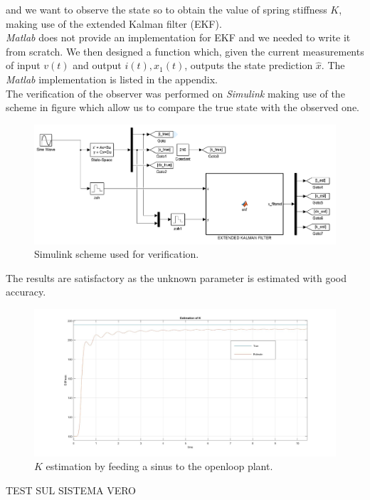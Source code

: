 and we want to observe the state so to obtain the value of spring stiffness $K$, making use of the extended Kalman filter (EKF).\\

\emph{Matlab} does not provide an implementation for EKF and we needed to write it from scratch. We then designed a function which, given the current measurements of input $v(t)$ and output $i(t), x_1(t)$, outputs the state prediction $\hat{x}$. The \emph{Matlab} implementation is listed in the appendix.\\

The verification of the observer was performed on \emph{Simulink} making use of the scheme in figure which allow us to compare the true state with the observed one.

 
\begin{figure}[h]
\centering
\includegraphics[width=0.7\linewidth]{img/ekf_scheme}
\caption{Simulink scheme used for verification.}
\label{fig:ekfscheme}
\end{figure}

The results are satisfactory as the unknown parameter is estimated with good accuracy.\\

\begin{figure}[h]
\centering
\includegraphics[width=0.7\linewidth]{img/ekf_sin}
\caption{$K$ estimation by feeding a sinus to the openloop plant.}
\label{fig:ekfsin}
\end{figure}


TEST SUL SISTEMA VERO